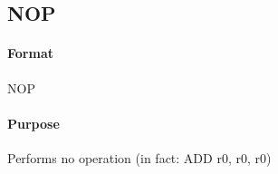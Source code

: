 \subsection{NOP}


\paragraph{Format} NOP

\paragraph{Purpose} Performs no operation (in fact: ADD r0, r0, r0)